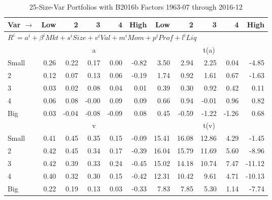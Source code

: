 
\begin{table}[!ht]
\footnotesize
\centering
\caption{25-Size-Var Portfolios with B2016b Factors 1963-07 through 2016-12}
\begin{tabular}{lrrrrrrrrrr}
  \toprule
    Var $\rightarrow$ & Low & 2 & 3 & 4 & High & Low & 2 & 3 & 4 & High \\ 
  \midrule
  \multicolumn{11}{l}{$R^i=a^i+\beta^iMkt+s^iSize+v^iVal+m^iMom+p^iProf+l^iLiq$} \\

  
    
      & \multicolumn{5}{c}{a} & \multicolumn{5}{c}{t(a)}
    
    \\
      \cmidrule(r){2-6} \cmidrule(r){7-11}

    Small   & 0.26  & 0.22  & 0.17  & 0.00  & -0.82  & 3.50  & 2.94  & 2.25  & 0.04  & -4.85  \\
         2  & 0.12  & 0.07  & 0.13  & 0.06  & -0.19  & 1.74  & 0.92  & 1.61  & 0.67  & -1.63  \\
         3  & 0.03  & 0.02  & 0.08  & 0.04  & 0.01  & 0.39  & 0.30  & 0.92  & 0.42  & 0.11  \\
         4  & 0.06  & 0.08  & -0.00  & 0.09  & 0.09  & 0.66  & 0.94  & -0.01  & 0.96  & 0.82  \\
    Big     & 0.03  & -0.04  & -0.08  & -0.09  & 0.08  & 0.45  & -0.59  & -1.22  & -1.26  & 0.68  \\

  
    
      & \multicolumn{5}{c}{v} & \multicolumn{5}{c}{t(v)}
    
    \\
      \cmidrule(r){2-6} \cmidrule(r){7-11}

    Small   & 0.41  & 0.45  & 0.35  & 0.15  & -0.09  & 15.41  & 16.08  & 12.86  & 4.29  & -1.45  \\
         2  & 0.42  & 0.45  & 0.34  & 0.17  & -0.39  & 16.04  & 15.79  & 11.69  & 5.60  & -8.96  \\
         3  & 0.42  & 0.39  & 0.33  & 0.24  & -0.45  & 15.02  & 14.18  & 10.74  & 7.47  & -11.12  \\
         4  & 0.40  & 0.32  & 0.30  & 0.15  & -0.42  & 12.31  & 10.42  & 9.61  & 4.71  & -10.13  \\
    Big     & 0.22  & 0.19  & 0.13  & 0.03  & -0.33  & 7.83  & 7.85  & 5.30  & 1.14  & -7.74  \\

  
    

\end{tabular}
\end{table}
